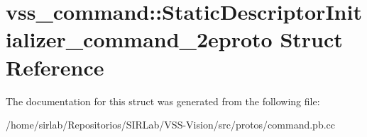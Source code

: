 \hypertarget{structvss__command_1_1StaticDescriptorInitializer__command__2eproto}{\section{vss\-\_\-command\-:\-:Static\-Descriptor\-Initializer\-\_\-command\-\_\-2eproto Struct Reference}
\label{structvss__command_1_1StaticDescriptorInitializer__command__2eproto}
}


The documentation for this struct was generated from the following file\-:\begin{DoxyCompactItemize}
\item 
/home/sirlab/\-Repositorios/\-S\-I\-R\-Lab/\-V\-S\-S-\/\-Vision/src/protos/command.\-pb.\-cc\end{DoxyCompactItemize}
